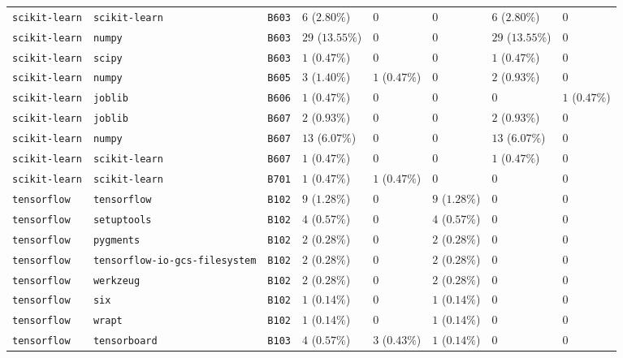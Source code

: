 \begin{table}
\begin{tabular}{llllllll}
\texttt{scikit-learn} & \texttt{scikit-learn} & \texttt{B603} & $6$ ($2.80\%$) & $0$ & $0$ & $6$ ($2.80\%$) & $0$ \\
\texttt{scikit-learn} & \texttt{numpy} & \texttt{B603} & $29$ ($13.55\%$) & $0$ & $0$ & $29$ ($13.55\%$) & $0$ \\
\texttt{scikit-learn} & \texttt{scipy} & \texttt{B603} & $1$ ($0.47\%$) & $0$ & $0$ & $1$ ($0.47\%$) & $0$ \\
\texttt{scikit-learn} & \texttt{numpy} & \texttt{B605} & $3$ ($1.40\%$) & $1$ ($0.47\%$) & $0$ & $2$ ($0.93\%$) & $0$ \\
\texttt{scikit-learn} & \texttt{joblib} & \texttt{B606} & $1$ ($0.47\%$) & $0$ & $0$ & $0$ & $1$ ($0.47\%$) \\
\texttt{scikit-learn} & \texttt{joblib} & \texttt{B607} & $2$ ($0.93\%$) & $0$ & $0$ & $2$ ($0.93\%$) & $0$ \\
\texttt{scikit-learn} & \texttt{numpy} & \texttt{B607} & $13$ ($6.07\%$) & $0$ & $0$ & $13$ ($6.07\%$) & $0$ \\
\texttt{scikit-learn} & \texttt{scikit-learn} & \texttt{B607} & $1$ ($0.47\%$) & $0$ & $0$ & $1$ ($0.47\%$) & $0$ \\
\texttt{scikit-learn} & \texttt{scikit-learn} & \texttt{B701} & $1$ ($0.47\%$) & $1$ ($0.47\%$) & $0$ & $0$ & $0$ \\
\texttt{tensorflow} & \texttt{tensorflow} & \texttt{B102} & $9$ ($1.28\%$) & $0$ & $9$ ($1.28\%$) & $0$ & $0$ \\
\texttt{tensorflow} & \texttt{setuptools} & \texttt{B102} & $4$ ($0.57\%$) & $0$ & $4$ ($0.57\%$) & $0$ & $0$ \\
\texttt{tensorflow} & \texttt{pygments} & \texttt{B102} & $2$ ($0.28\%$) & $0$ & $2$ ($0.28\%$) & $0$ & $0$ \\
\texttt{tensorflow} & \texttt{tensorflow-io-gcs-filesystem} & \texttt{B102} & $2$ ($0.28\%$) & $0$ & $2$ ($0.28\%$) & $0$ & $0$ \\
\texttt{tensorflow} & \texttt{werkzeug} & \texttt{B102} & $2$ ($0.28\%$) & $0$ & $2$ ($0.28\%$) & $0$ & $0$ \\
\texttt{tensorflow} & \texttt{six} & \texttt{B102} & $1$ ($0.14\%$) & $0$ & $1$ ($0.14\%$) & $0$ & $0$ \\
\texttt{tensorflow} & \texttt{wrapt} & \texttt{B102} & $1$ ($0.14\%$) & $0$ & $1$ ($0.14\%$) & $0$ & $0$ \\
\texttt{tensorflow} & \texttt{tensorboard} & \texttt{B103} & $4$ ($0.57\%$) & $3$ ($0.43\%$) & $1$ ($0.14\%$) & $0$ & $0$ \\

\end{tabular}
\end{table}
